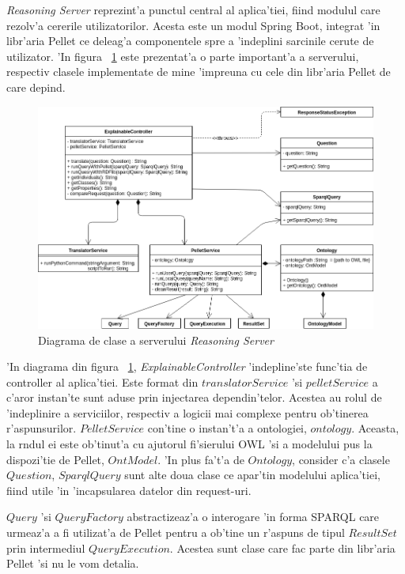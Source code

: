 \documentclass[12pt,a4paper,twoside]{report}
\begin{document}
{\it Reasoning Server} reprezint'a punctul central al aplica'tiei, fiind modulul care rezolv'a cererile utilizatorilor. Acesta este un modul Spring Boot, integrat 'in libr'aria Pellet ce deleag'a componentele spre a 'indeplini sarcinile cerute de utilizator. 'In figura ~\ref{fig:uml_server} este prezentat'a o parte important'a a serverului, respectiv clasele implementate de mine 'impreuna cu cele din libr'aria Pellet de care depind.
\begin{figure}[h!]
    \centering
    \includegraphics[width = 0.9\linewidth]{img/uml_server.png}
        \caption{Diagrama de clase a serverului {\it Reasoning Server}}
    \label{fig:uml_server}
\end{figure}

'In diagrama din figura ~\ref{fig:uml_server}, {\it ExplainableController} 'indepline'ste func'tia de controller al aplica'tiei. Este format din $translatorService$ 'si $pelletService$ a c'aror instan'te sunt aduse prin injectarea dependin'telor. Acestea au rolul de 'indeplinire a serviciilor, respectiv a logicii mai complexe pentru ob'tinerea r'aspunsurilor. $PelletService$ con'tine o instan't'a a ontologiei, $ontology$. Aceasta, la r\ia ndul ei este ob'tinut'a cu ajutorul fi'sierului OWL 'si a modelului pus la dispozi'tie de Pellet, $OntModel$. 'In plus fa't'a de $Ontology$, consider c'a clasele $Question$, $SparqlQuery$ sunt alte doua clase ce apar'tin modelului aplica'tiei, fiind utile 'in 'incapsularea datelor din request-uri.

$Query$ 'si $QueryFactory$ abstractizeaz'a o interogare 'in forma SPARQL care urmeaz'a a fi utilizat'a de Pellet pentru a ob'tine un r'aspuns de tipul $ResultSet$ prin intermediul $QueryExecution$. Acestea sunt clase care fac parte din libr'aria Pellet 'si nu le vom detalia.
\end{document}
